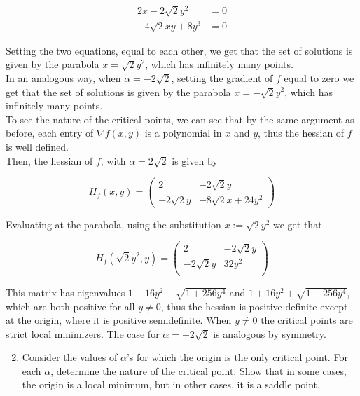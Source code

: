 \documentclass[10pt]{article}
\begin{document}
\setcounter{equation}{0}

\begin{align}
    2x - 2\sqrt{2} y^2 &= 0\\
    -4\sqrt{2} xy + 8y^3 &= 0
\end{align}

Setting the two equations, equal to each other, we get that the set of solutions is 
given by the parabola $x = \sqrt{2} y^2$, which has infinitely many points.\\

In an analogous way, when $\alpha = -2\sqrt{2}$, setting the gradient of $f$ equal to zero we get
that the set of solutions is given by the parabola $x = -\sqrt{2} y^2$, which has infinitely many points.\\

To see the nature of the critical points, we can see that by the same argument as before, each entry of $\nabla f(x,y)$ is a polynomial in $x$ and $y$, thus the hessian of $f$ is well defined.\\

Then, the hessian of $f$, with $\alpha = 2\sqrt{2}$ is given by

$$H_f(x,y) = \begin{pmatrix}
2 & -2\sqrt{2}y \\
-2\sqrt{2}y & -8\sqrt{2}x + 24y^2
\end{pmatrix}$$

Evaluating at the parabola, using the substitution $x := \sqrt{2} y^2$ we get that

$$H_f(\sqrt{2} y^2, y) = \begin{pmatrix}
2 & -2\sqrt{2}y \\
-2\sqrt{2}y & 32y^2\\
\end{pmatrix}$$

This matrix has eigenvalues $1 + 16y^2 - \sqrt{1+256y^4}$ and $1 + 16y^2 + \sqrt{1+256y^4}$, which are both positive for all $y \neq 0$, thus the hessian is positive definite 
except at the origin, where it is positive semidefinite. When $y \neq 0$  the critical points are strict local minimizers. The case for $\alpha = -2\sqrt{2}$ is analogous by symmetry.\\ 




\begin{enumerate}[label=(\alph*)]
    \setcounter{enumi}{1}
    \item Consider the values of $\alpha$’s for which the origin is the only critical point. For each $\alpha$, determine the nature of the critical point. Show that in some cases, the origin is a local minimum, but in other cases, it is a saddle point.
\end{enumerate}
\end{document}
